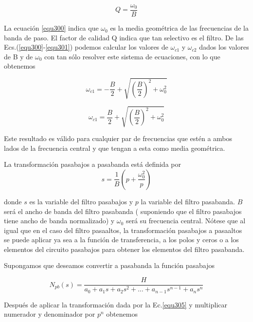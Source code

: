 \documentclass[12pt]{book}
\theoremstyle{definition}
\theoremstyle{remark}
\theoremstyle{plain}
\begin{document}
\begin{equation}
 Q = \frac{\omega _{0}}{B}
\label{equ301}
\end{equation}

La ecuación \ref{equ300} indica que $\omega _0$ es la media geométrica de las frecuencias de la banda de paso. El factor de calidad Q indica que tan selectivo es 
el filtro. De las Ecs.(\ref{equ300}-\ref{equ301}) podemos calcular los valores de  $\omega _{c1}$ y $\omega _{c2}$ dados los valores de B y de $\omega _0$ con tan sólo resolver este sistema de ecuaciones, 
con lo que obtenemos

\begin{equation}
 \omega _{c1}= - \frac{B}{2}+\sqrt{\left(\frac{B}{2}\right)^2+\omega _0^2}
\label{equ302}
\end{equation}

\begin{equation}
 \omega _{c1}= \frac{B}{2}+\sqrt{\left(\frac{B}{2}\right)^2+\omega _0^2}
\label{equ303}
\end{equation}

Este resultado es válido para cualquier par de frecuencias que estén a ambos lados de la frecuencia central y que tengan a esta como media geométrica.

La transformación pasabajos a pasabanda  está definida por
\begin{equation}
 s= \frac{1}{B} \left(p+\frac{\omega _0^2}{p} \right)
\label{equ304}
\end{equation}

donde $s$ es la variable del filtro pasabajos y $p$ la variable del filtro pasabanda. $B$ será el ancho de banda del filtro pasabanda ( suponiendo que el filtro pasabajos
tiene ancho de banda normalizado) y $\omega _0$ será su frecuencia central.
Nótese que al igual que en el caso del filtro pasaaltos, la transformación pasabajos a pasaaltos se puede aplicar ya sea a la función de transferencia, 
a los polos y ceros o a los elementos del circuito pasabajos para obtener los elementos del filtro pasabanda.

Supongamos que deseamos convertir a pasabanda la función pasabajos 

\begin{equation}
 N_{pb}(s)=\frac{H}{a_0+a_1 s+a_2 s^2+...+a_{n-1}s^{n-1}+a_n s^n}
\label{equ305}
\end{equation}

Después de aplicar la transformación dada por la Ec.\ref{equ305} y multiplicar numerador y denominador por $p^n$ obtenemos
\end{document}
